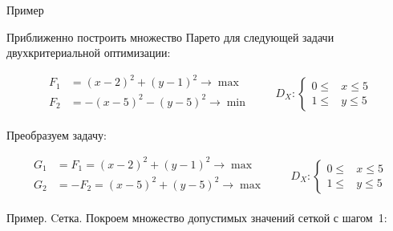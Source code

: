 \documentclass[unicode,11pt,notheorems,xcolor=table]{beamer}
\begin{document}
\begin{frame}{Пример}{}
    \begin{exampleblock}{}
        Приближенно построить множество Парето для следующей задачи двухкритериальной оптимизации:
    
    $$  
    \begin{aligned}
        F_1 &= (x-2)^2+(y-1)^2 \to \max\\
        F_2 &= -(x-5)^2 -(y-5)^2 \to \min\\
    \end{aligned}
        \qquad
        D_X\colon 
        \left\lbrace
        \begin{aligned}
            0 \leqslant &x \leqslant 5\\
            1 \leqslant &y \leqslant 5    
        \end{aligned}
        \right.
    $$
\end{exampleblock}
\pause
Преобразуем задачу:

$$  
\begin{aligned}
    G_1 &= F_1 = (x-2)^2+(y-1)^2 \to \max\\
    G_2 &= -F_2 = (x-5)^2 + (y-5)^2 \to \max\\
\end{aligned}
    \qquad
    D_X\colon 
    \left\lbrace
    \begin{aligned}
        0 \leqslant &x \leqslant 5\\
        1 \leqslant &y \leqslant 5    
    \end{aligned}
    \right.
$$

\end{frame}

\begin{frame}{Пример. Cетка.}
    Покроем множество допустимых значений сеткой с шагом~1:
    
    {\centering
    \par}
\end{frame}
\end{document}
